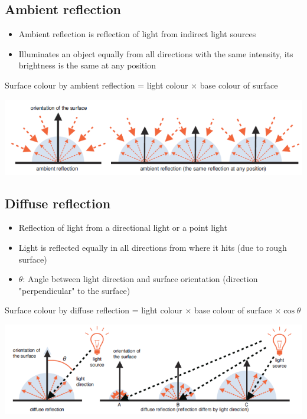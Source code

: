 \documentclass{article}[18pt]
\begin{document}
\subsection{Ambient reflection}
\begin{itemize}
	\item Ambient reflection is reflection of light from indirect light sources
	\item Illuminates an object equally from all directions with the same intensity, its brightness is the same at any position
\end{itemize}
\begin{center}
	Surface colour by ambient reflection  = light colour $\times$ base colour of surface
\end{center}
\begin{center}
	\includegraphics[scale=0.7]{"Ambient Reflection"}
\end{center}
\subsection{Diffuse reflection}
\begin{itemize}
	\item Reflection of light from a directional light or a point light
	\item Light is reflected equally in all directions from where it hits (due to rough surface)
	\item $\theta$: Angle between light direction and surface orientation (direction "perpendicular" to the surface)
\end{itemize}
\begin{center}
	Surface colour by diffuse reflection = light colour $\times$ base colour of surface $\times \cos\theta$
\end{center}
\begin{center}
	\includegraphics[scale=0.7]{"Diffuse Refection"}
\end{center}
\end{document}
